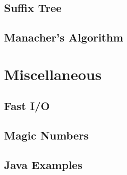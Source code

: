\documentclass[10pt,landscape,a4paper,twocolumn]{article}
\begin{document}
\subsection{Suffix Tree}

\subsection{Manacher's Algorithm}



\section{Miscellaneous}

\subsection{Fast I/O}


\subsection{Magic Numbers}

\subsection{Java Examples}
\end{document}
